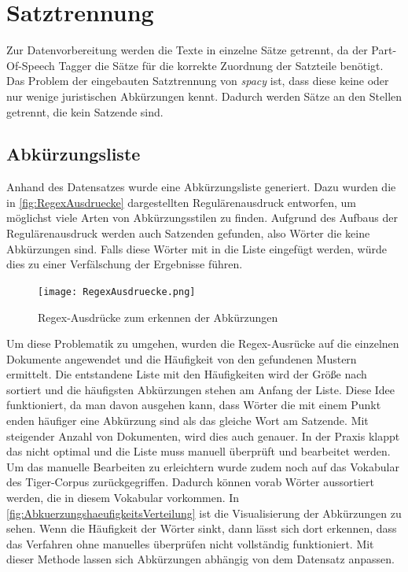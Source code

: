 \section{Satztrennung} \label{satztrennung}
Zur Datenvorbereitung werden die Texte in einzelne Sätze getrennt, da der Part-Of-Speech Tagger die Sätze für die korrekte Zuordnung der Satzteile benötigt. Das Problem der eingebauten Satztrennung von \textit{spacy} ist, dass diese keine oder nur wenige juristischen Abkürzungen kennt. Dadurch werden Sätze an den Stellen getrennt, die kein Satzende sind.


\subsection{Abkürzungsliste}
Anhand des Datensatzes wurde eine Abkürzungsliste generiert. Dazu wurden die in \autoref{fig:RegexAusdruecke} dargestellten Regulärenausdruck entworfen, um möglichst viele Arten von Abkürzungsstilen zu finden. Aufgrund des Aufbaus der Regulärenausdruck werden auch Satzenden gefunden, also Wörter die keine Abkürzungen sind. Falls diese Wörter mit in die Liste eingefügt werden, würde dies zu einer Verfälschung der Ergebnisse führen.

\begin{figure}[h]
	\centering
	\texttt{[image: RegexAusdruecke.png]}
	\caption{Regex-Ausdrücke zum erkennen der Abkürzungen}
	\label{fig:RegexAusdruecke}
\end{figure}

Um diese Problematik zu umgehen, wurden die Regex-Ausrücke auf die einzelnen Dokumente angewendet und die Häufigkeit von den gefundenen Mustern ermittelt. Die entstandene Liste mit den Häufigkeiten wird der Größe nach sortiert und die häufigsten Abkürzungen stehen am Anfang der Liste. Diese Idee funktioniert, da man davon ausgehen kann, dass Wörter die mit einem Punkt enden häufiger eine Abkürzung sind als das gleiche Wort am Satzende. Mit steigender Anzahl von Dokumenten, wird dies auch genauer. In der Praxis klappt das nicht optimal und die Liste muss manuell überprüft und bearbeitet werden. Um das manuelle Bearbeiten zu erleichtern wurde zudem noch auf das Vokabular des Tiger-Corpus zurückgegriffen. Dadurch können vorab Wörter aussortiert werden, die in diesem Vokabular vorkommen.  In \autoref{fig:AbkuerzungshaeufigkeitsVerteilung} ist die Visualisierung der Abkürzungen zu sehen. Wenn die Häufigkeit der Wörter sinkt, dann lässt sich dort erkennen, dass das Verfahren ohne manuelles überprüfen nicht vollständig funktioniert. Mit dieser Methode lassen sich Abkürzungen abhängig von dem Datensatz anpassen.

